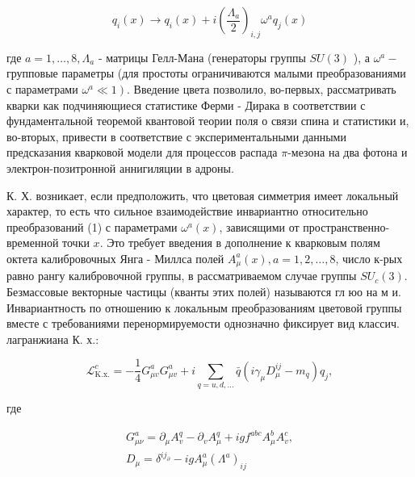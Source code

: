 \documentclass[10pt]{article}
\begin{document}
\[

q_{i}(x) \rightarrow q_{i}(x)+i\left(\frac{\Lambda_{a}}{2}\right)_{i, j} \omega^{a} q_{j}(x)

\]



где $a=1, \ldots, 8, \Lambda_{a}$ - матрицы Гелл-Мана (генераторы группы $S U(3)$ ), а $\omega^{a}-$ групповые параметры (для простоты ограничиваются малыми преобразованиями с параметрами $\left.\omega^{a} \ll 1\right)$. Введение цвета позволило, во-первых, рассматривать кварки как подчиняющиеся статистике Ферми - Дирака в соответствии с фундаментальной теоремой квантовой теории поля о связи спина и статистики и, во-вторых, привести в соответствие с экспериментальными данными предсказания кварковой модели для процессов распада $\pi$-мезона на два фотона и электрон-позитронной аннигиляции в адроны.



К. Х. возникает, если предположить, что цветовая симметрия имеет локальный характер, то есть что сильное взаимодействие инвариантно относительно преобразований (1) с параметрами $\omega^{a}(x)$, зависящими от пространственно-временной точки $x$. Это требует введения в дополнение к кварковым полям октета калибровочных Янга - Миллса полей $A_{\mu}^{a}(x), a=1,2, \ldots, 8$, число к-рых равно рангу калибровочной группы, в рассматриваемом случае группы $S U_{c}(3)$. Безмассовые векторные частицы (кванты этих полей) называются гл юо на м и. Инвариантность по отношению к локальным преобразованиям цветовой группы вместе с требованиями перенормируемости однозначно фиксирует вид классич. лагранжиана К. х.:



\[

\mathscr{L}_{\mathrm{K} . \mathrm{x} .}^{c}=-\frac{1}{4} G_{\mu v}^{a} G_{\mu v}^{a}+i \sum_{q=u, d, \ldots} \bar{q}\left(i \gamma_{\mu} D_{\mu}^{i j}-m_{q}\right) q_{j},

\]



где



\[

\begin{gathered}

G_{\mu \nu}^{a}=\partial_{\mu} A_{v}^{q}-\partial_{v} A_{\mu}^{q}+i g f^{a b c} A_{\mu}^{b} A_{v}^{c}, \\

D_{\mu}=\delta^{i j_{\partial}}-i g A_{\mu}^{a}\left(\Lambda^{a}\right)_{i j}

\end{gathered}

\]
\end{document}
